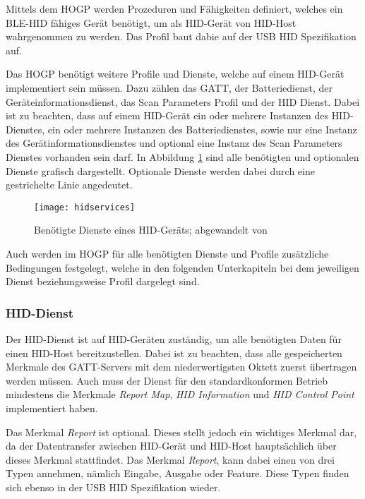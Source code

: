 Mittels dem \acl{HOGP} werden Prozeduren und Fähigkeiten definiert, welches ein \acs{BLE}-\acs{HID} fähiges Gerät benötigt, um als \acs{HID}-Gerät von \acs{HID}-Host wahrgenommen zu werden. Das Profil baut dabie auf der USB \acs{HID} Spezifikation auf. \cite[S.~9]{bluetoothHOGP}

Das \acf{HOGP} benötigt weitere Profile und Dienste, welche auf einem \acs{HID}-Gerät implementiert sein müssen. Dazu zählen das \acs{GATT}, der Batteriedienst, der Geräteinformationsdienst, das Scan Parameters Profil und der \acs{HID} Dienst. Dabei ist zu beachten, dass auf einem \acs{HID}-Gerät ein oder mehrere Instanzen des \acs{HID}-Dienstes, ein oder mehrere Instanzen des Batteriedienstes, sowie nur eine Instanz des Gerätinformationsdienstes und optional eine Instanz des Scan Parameters Dienstes vorhanden sein darf. \cite[S.~9, S.~11]{bluetoothHOGP} In Abbildung \ref{fig:hidservices} sind alle benötigten und optionalen Dienste grafisch dargestellt. Optionale Dienste werden dabei durch eine gestrichelte Linie angedeutet.

\begin{figure}[h]
    \centering
    \texttt{[image: hidservices]}
    \caption{Benötigte Dienste eines \acs{HID}-Geräts; abgewandelt von \cite[S.~11]{bluetoothHOGP}}
    \label{fig:hidservices}
\end{figure}

Auch werden im \acl{HOGP} für alle benötigten Dienste und Profile zusätzliche Bedingungen festgelegt, welche in den folgenden Unterkapiteln bei dem jeweiligen Dienst beziehungsweise Profil dargelegt sind.

\subsubsection{\ac{HID}-Dienst}

Der \acs{HID}-Dienst ist auf \acs{HID}-Geräten zuständig, um alle benötigten Daten für einen \acs{HID}-Host bereitzustellen. Dabei ist zu beachten, dass alle gespeicherten Merkmale des \acs{GATT}-Servers mit dem niederwertigsten Oktett zuerst übertragen werden müssen. Auch muss der Dienst für den standardkonformen Betrieb mindestens die Merkmale \textit{Report Map}, \textit{HID Information} und \textit{HID Control Point} implementiert haben. \cite[S.~8ff.]{bluetoothHIDS}

Das Merkmal \textit{Report} ist optional. Dieses stellt jedoch ein wichtiges Merkmal dar, da der Datentransfer zwischen \acs{HID}-Gerät und \acs{HID}-Host hauptsächlich über dieses Merkmal stattfindet. Das Merkmal \textit{Report}, kann dabei einen von drei Typen annehmen, nämlich Eingabe, Ausgabe oder Feature. Diese Typen finden sich ebenso in der USB \acs{HID} Spezifikation wieder. \cite[S.~11f.]{bluetoothHIDS}

